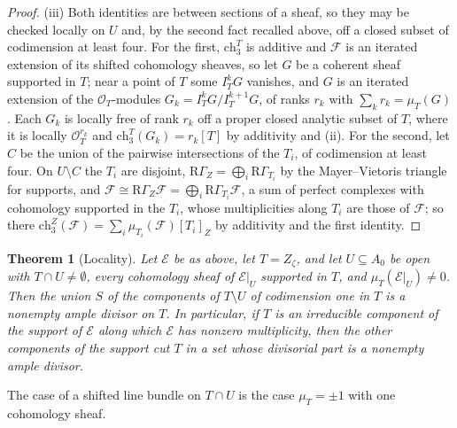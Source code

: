 \documentclass[11pt,reqno]{amsart}
\numberwithin{equation}{section}
\theoremstyle{plain}
\newtheorem{theorem}{Theorem}[section]
\theoremstyle{definition}
\newcommand{\ch}{\mathrm{ch}}
\begin{document}
\begin{proof}
(iii) Both identities are between sections of a sheaf, so they may be checked locally on $U$ and, by the second fact recalled above, off a closed subset of codimension at least four. For the first, $\ch^{T}_{3}$ is additive and $\mathcal{F}$ is an iterated extension of its shifted cohomology sheaves, so let $G$ be a coherent sheaf supported in $T$; near a point of $T$ some $I_{T}^{k}G$ vanishes, and $G$ is an iterated extension of the $\mathcal{O}_{T}$-modules $G_{k}=I_{T}^{k}G/I_{T}^{k+1}G$, of ranks $r_{k}$ with $\sum_{k}r_{k}=\mu_{T}(G)$. Each $G_{k}$ is locally free of rank $r_{k}$ off a proper closed analytic subset of $T$, where it is locally $\mathcal{O}_{T}^{r_{k}}$ and $\ch^{T}_{3}(G_{k})=r_{k}[T]$ by additivity and (ii). For the second, let $C$ be the union of the pairwise intersections of the $T_{i}$, of codimension at least four. On $U\setminus C$ the $T_{i}$ are disjoint, $\mathrm{R}\Gamma_{Z}=\bigoplus_{i}\mathrm{R}\Gamma_{T_{i}}$ by the Mayer--Vietoris triangle for supports, and $\mathcal{F}\cong\mathrm{R}\Gamma_{Z}\mathcal{F}=\bigoplus_{i}\mathrm{R}\Gamma_{T_{i}}\mathcal{F}$, a sum of perfect complexes with cohomology supported in the $T_{i}$, whose multiplicities along $T_{i}$ are those of $\mathcal{F}$; so there $\ch^{Z}_{3}(\mathcal{F})=\sum_{i}\mu_{T_{i}}(\mathcal{F})[T_{i}]_{Z}$ by additivity and the first identity.
\end{proof}

\begin{theorem}[Locality]\label{thm:locality}
Let $\mathcal{E}$ be as above, let $T=Z_{\zeta}$, and let $U\subseteq A_{0}$ be open with $T\cap U\ne\emptyset$, every cohomology sheaf of $\mathcal{E}|_{U}$ supported in $T$, and $\mu_{T}(\mathcal{E}|_{U})\ne0$. Then the union $S$ of the components of $T\setminus U$ of codimension one in $T$ is a nonempty ample divisor on $T$. In particular, if $T$ is an irreducible component of the support of $\mathcal{E}$ along which $\mathcal{E}$ has nonzero multiplicity, then the other components of the support cut $T$ in a set whose divisorial part is a nonempty ample divisor.
\end{theorem}

The case of a shifted line bundle on $T\cap U$ is the case $\mu_{T}=\pm1$ with one cohomology sheaf.
\end{document}
